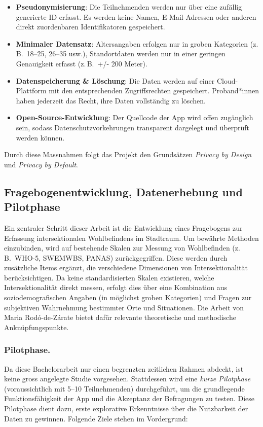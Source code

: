\documentclass{template}
\begin{document}
\begin{itemize}
    \item \textbf{Pseudonymisierung}: Die Teilnehmenden werden nur über eine zufällig generierte ID erfasst. Es werden keine Namen, E-Mail-Adressen oder anderen direkt zuordenbaren Identifikatoren gespeichert.
    \item \textbf{Minimaler Datensatz}: Altersangaben erfolgen nur in groben Kategorien (z.\,B.\ 18–25, 26–35 usw.), Standortdaten werden nur in einer geringen Genauigkeit erfasst (z.\,B.\ +/- 200 Meter).
    \item \textbf{Datenspeicherung \& Löschung}: Die Daten werden auf einer Cloud-Plattform mit den entsprechenden Zugriffsrechten gespeichert. Proband*innen haben jederzeit das Recht, ihre Daten vollständig zu löschen.
    \item \textbf{Open-Source-Entwicklung}: Der Quellcode der App wird offen zugänglich sein, sodass Datenschutzvorkehrungen transparent dargelegt und überprüft werden können.
\end{itemize}

Durch diese Massnahmen folgt das Projekt den Grundsätzen \textit{Privacy by Design} und \textit{Privacy by Default}.

\subsection{Fragebogenentwicklung, Datenerhebung und Pilotphase}

Ein zentraler Schritt dieser Arbeit ist die Entwicklung eines Fragebogens zur Erfassung intersektionalen Wohlbefindens im Stadtraum. Um bewährte Methoden einzubinden, wird auf bestehende Skalen zur Messung von Wohlbefinden (z.\,B.\ WHO-5, SWEMWBS, PANAS) zurückgegriffen. Diese werden durch zusätzliche Items ergänzt, die verschiedene Dimensionen von Intersektionalität berücksichtigen. Da keine standardisierten Skalen existieren, welche Intersektionalität direkt messen, erfolgt dies über eine Kombination aus soziodemografischen Angaben (in möglichst groben Kategorien) und Fragen zur subjektiven Wahrnehmung bestimmter Orte und Situationen. Die Arbeit von Maria Rodó-de-Zárate \textcite{rodo-de-zarate_developing_2014} bietet dafür relevante theoretische und methodische Anknüpfungspunkte.

\subsubsection{Pilotphase.}
Da diese Bachelorarbeit nur einen begrenzten zeitlichen Rahmen abdeckt, ist keine gross angelegte Studie vorgesehen. Stattdessen wird eine \textit{kurze Pilotphase} (voraussichtlich mit 5–10 Teilnehmenden) durchgeführt, um die grundlegende Funktionsfähigkeit der App und die Akzeptanz der Befragungen zu testen. Diese Pilotphase dient dazu, erste explorative Erkenntnisse über die Nutzbarkeit der Daten zu gewinnen. Folgende Ziele stehen im Vordergrund:
\end{document}
